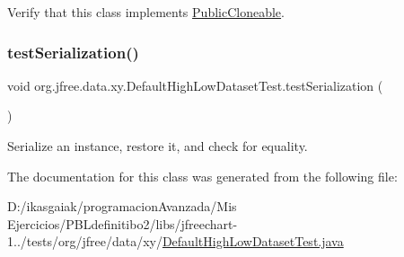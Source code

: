 Verify that this class implements \mbox{\hyperlink{}{Public\+Cloneable}}. \mbox{\label{classorg_1_1jfree_1_1data_1_1xy_1_1_default_high_low_dataset_test_a77cc3e9cd748a37bd7bc019e09de2a7b}} 
\subsubsection{\texorpdfstring{test\+Serialization()}{testSerialization()}}
{\footnotesize\ttfamily void org.\+jfree.\+data.\+xy.\+Default\+High\+Low\+Dataset\+Test.\+test\+Serialization (\begin{DoxyParamCaption}{ }\end{DoxyParamCaption})}

Serialize an instance, restore it, and check for equality. 

The documentation for this class was generated from the following file\+:\begin{DoxyCompactItemize}
\item 
D\+:/ikasgaiak/programacion\+Avanzada/\+Mis Ejercicios/\+P\+B\+Ldefinitibo2/libs/jfreechart-\/1../tests/org/jfree/data/xy/\mbox{\hyperlink{_default_high_low_dataset_test_8java}{Default\+High\+Low\+Dataset\+Test.\+java}}\end{DoxyCompactItemize}
